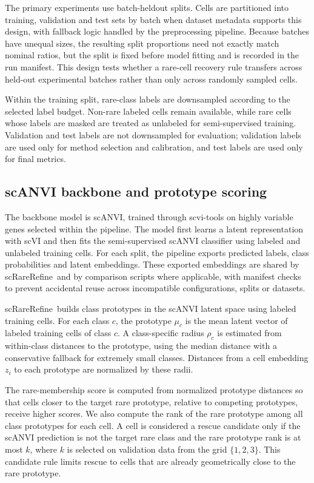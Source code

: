 \documentclass[11pt]{article}
\newcommand{\method}{scRareRefine}
\begin{document}
The primary experiments use batch-heldout splits. Cells are partitioned into
training, validation and test sets by batch when dataset metadata supports this
design, with fallback logic handled by the preprocessing pipeline. Because
batches have unequal sizes, the resulting split proportions need not exactly
match nominal ratios, but the split is fixed before model fitting and is
recorded in the run manifest. This design tests whether a rare-cell recovery
rule transfers across held-out experimental batches rather than only across
randomly sampled cells.

Within the training split, rare-class labels are downsampled according to the
selected label budget. Non-rare labeled cells remain available, while rare
cells whose labels are masked are treated as unlabeled for semi-supervised
training. Validation and test labels are not downsampled for evaluation;
validation labels are used only for method selection and calibration, and test
labels are used only for final metrics.

\subsection{scANVI backbone and prototype scoring}

The backbone model is scANVI, trained through scvi-tools on highly variable
genes selected within the pipeline. The model first learns a latent
representation with scVI and then fits the semi-supervised scANVI classifier
using labeled and unlabeled training cells. For each split, the pipeline exports
predicted labels, class probabilities and latent embeddings. These exported
embeddings are shared by \method\ and by comparison scripts where applicable,
with manifest checks to prevent accidental reuse across incompatible
configurations, splits or datasets.

\method\ builds class prototypes in the scANVI latent space using labeled
training cells. For each class $c$, the prototype $\mu_c$ is the mean latent
vector of labeled training cells of class $c$. A class-specific radius $\rho_c$
is estimated from within-class distances to the prototype, using the median
distance with a conservative fallback for extremely small classes. Distances
from a cell embedding $z_i$ to each prototype are normalized by these radii.

The rare-membership score is computed from normalized prototype distances so
that cells closer to the target rare prototype, relative to competing
prototypes, receive higher scores. We also compute the rank of the rare
prototype among all class prototypes for each cell. A cell is considered a
rescue candidate only if the scANVI prediction is not the target rare class and
the rare prototype rank is at most $k$, where $k$ is selected on validation data
from the grid $\{1,2,3\}$. This candidate rule limits rescue to cells that are
already geometrically close to the rare prototype.
\end{document}
